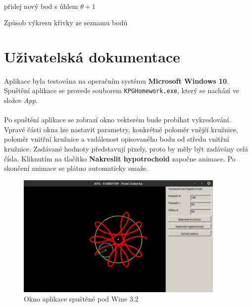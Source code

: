 \documentclass[12pt]{scrartcl}
\begin{document}
\paragraph{}
\begin{algorithm}[H]
	\BlankLine
	přidej nový bod s úhlem $\theta + 1$
	\BlankLine
 \caption{Způsob výkresu křivky ze seznamu bodů}
\end{algorithm}

\section{Uživatelská dokumentace}
\paragraph{}
Aplikace byla testována na operačním systému \textbf{Microsoft Windows 10}.
Spuštění aplikace se provede souborem \texttt{KPGHomework.exe}, který se nachází ve složce \emph{App}.

\paragraph{}
Po spuštění aplikace se zobrazí okno ve\nobreakspace kterém bude probíhat vykreslování. V\nobreakspace pravé části okna lze nastavit parametry, konkrétně poloměr vnější kružnice, poloměr vnitřní kružnice a vzdálenost opisovaného bodu od středu vnitřní kružnice. Zadávané hodnoty představují pixely, proto by měly být zadávány celá čísla. Kliknutím na tlačítko \textbf{Nakreslit hypotrochoid} započne animace. Po skončení animace se plátno automaticky smaže.

\begin{figure}[!ht]
	\centering
	\label{obr:polekolizi}
	\includegraphics[width=0.9\textwidth,natwidth=1,natheight=1]{app_gui.pdf}
	\caption{Okno aplikace spuštěné pod Wine 3.2}
\end{figure}	
\end{document}
